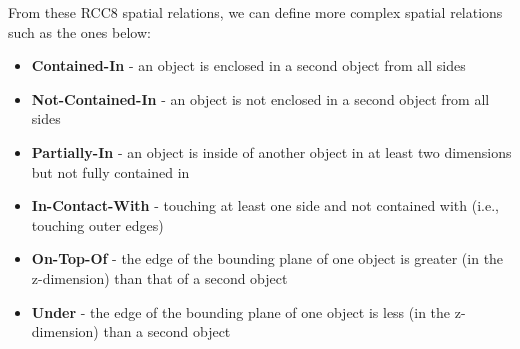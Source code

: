 \documentclass[preprint,12pt]{elsarticle}
\newcommand{\sr}[1] {\textbf{#1}}
\begin{document}
From these RCC8 spatial relations, we can define more complex spatial relations such as the ones below:
\begin{itemize}
  \item \sr{Contained-In} - an object is enclosed in a second object from all sides
  \item \sr{Not-Contained-In} - an object is not enclosed in a second object from all sides
  \item \sr{Partially-In} - an object is inside of another object in at least two dimensions but not fully contained in
  \item \sr{In-Contact-With} - touching at least one side and not contained with (i.e., touching outer edges)
  \item \sr{On-Top-Of} - the edge of the bounding plane of one object is greater (in the z-dimension) than that of a second object
  \item \sr{Under} - the edge of the bounding plane of one object is less (in the z-dimension) than a second object
\end{itemize}
\end{document}
